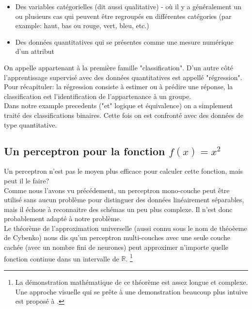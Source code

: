 \documentclass[twoside,openright,a4paper,11pt,french]{article}
\begin{document}
\begin{itemize}
\item Des variables catégorielles (dit aussi qualitative) - où il y a généralement
      un ou plusieurs cas qui peuvent être regroupés en différentes catégories 
     (par example: haut, bas ou rouge, vert, bleu, etc.)
\item Des données quantitatives qui se présentes comme une mesure numérique d'un attribut
\end{itemize}

On appelle %
appartenant à la première famille "classification". D'un autre côté l'apprentissage
supervisé avec des données quantitatives est appellé "régression".\cite{kindsNN}\\

Pour récapituler: la régression consiste à estimer ou à prédire une réponse,
la classification est l'identification de l'appartenance à un groupe.\\

Dans notre example precedents ("et" logique et équivalence) on a simplement
traité des classifications binaires. Cette fois on est confronté avec des données
de type quantitative.


\subsection{Un perceptron pour la fonction $f(x) = x^2$}
Un perceptron n'est pas le moyen plus efficace pour calculer cette 
fonction, mais peut il le faire?\\

Comme nous l'avons vu précédement, un perceptron mono-couche peut être utilisé sans aucun
problème pour distinguer des données linéairement séparables, mais il échoue 
à reconnaitre des schémas un peu plus complexe. Il n'est donc 
probablement adapté à notre problème.\\

Le théorème de l'approximation universelle (aussi connu sous le nom de théoèeme de Cybenko) 
nous dis qu'un perceptron multi-couches avec une seule couche cachée (avec un nombre
fini de neurones) peut approximer n'importe quelle fonction continue dans un 
intervalle de $\mathbb{R}$.
\footnote{
La démonstration mathématique de ce théorème est assez longue et complexe. Une approche visuelle
qui se prête à une demonstration beaucoup plus intuive est proposé à \cite{visuniprof}.
}
\cite{cybthm}
\end{document}
